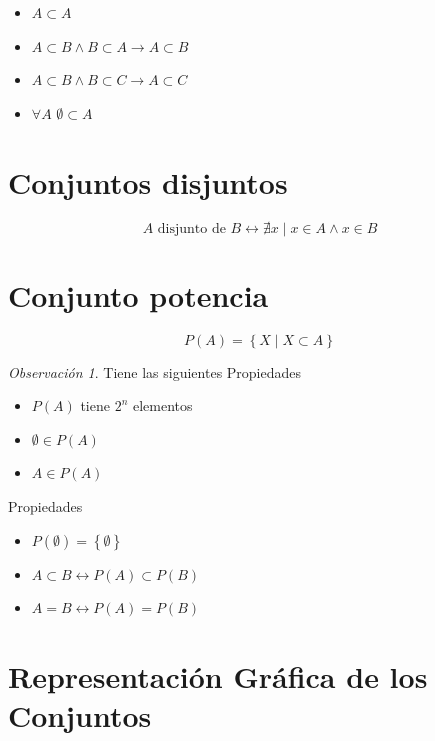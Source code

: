 \documentclass[
  16pt,
]{krantz}
\providecommand{\tightlist}{%
  \setlength{\itemsep}{0pt}\setlength{\parskip}{0pt}}
\theoremstyle{definition}
\theoremstyle{definition}
\theoremstyle{definition}
\theoremstyle{definition}
\theoremstyle{remark}
\newtheorem*{remark}{Observación}
\begin{document}
\begin{itemize}
\tightlist
\item
  \(A\subset A\)
\item
  \(A\subset B\wedge B\subset A\rightarrow A\subset B\)
\item
  \(A\subset B\wedge B\subset C\rightarrow A\subset C\)
\item
  \(\forall A\) \(\emptyset\subset A\)
\end{itemize}

\hypertarget{conjuntos-disjuntos}{%
\section{Conjuntos disjuntos}\label{conjuntos-disjuntos}}

\[
A\text{ disjunto de } B\leftrightarrow\nexists x\;|\; x\in A\wedge x\in B  
\]

\hypertarget{conjunto-potencia}{%
\section{Conjunto potencia}\label{conjunto-potencia}}

\[
P(A)=\left\{X\;|\;X\subset A\right\}
\]

\begin{remark}

Tiene las siguientes Propiedades

\begin{itemize}
\tightlist
\item
  \(P(A)\) tiene \(2^n\) elementos
\item
  \(\emptyset\in P(A)\)
\item
  \(A\in P(A)\)
\end{itemize}

\end{remark}

Propiedades

\begin{itemize}
\tightlist
\item
  \(P(\emptyset)=\left\{\emptyset\right\}\)
\item
  \(A\subset B\leftrightarrow P(A)\subset P(B)\)
\item
  \(A= B\leftrightarrow P(A)= P(B)\)
\end{itemize}

\hypertarget{representaciuxf3n-gruxe1fica-de-los-conjuntos}{%
\section{Representación Gráfica de los Conjuntos}\label{representaciuxf3n-gruxe1fica-de-los-conjuntos}}
\end{document}
